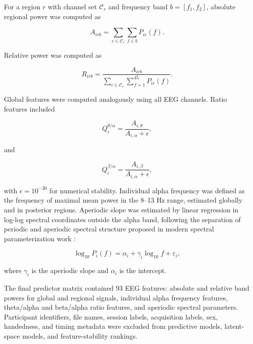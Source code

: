 \documentclass[journal]{IEEEtran}
\begin{document}
For a region $r$ with channel set $\mathcal{C}_r$ and frequency band $b=[f_1,f_2]$, absolute regional power was computed as

\begin{equation}
A_{irb}=\sum_{c\in\mathcal{C}_r}\sum_{f\in b} P_{ic}(f).
\end{equation}

Relative power was computed as

\begin{equation}
R_{irb}=\frac{A_{irb}}{\sum_{c\in\mathcal{C}_r}\sum_{f=1}^{45}P_{ic}(f)}.
\end{equation}

Global features were computed analogously using all EEG channels. Ratio features included

\begin{equation}
Q^{\theta/\alpha}_{i}=\frac{A_{i,\theta}}{A_{i,\alpha}+\epsilon},
\end{equation}

and

\begin{equation}
Q^{\beta/\alpha}_{i}=\frac{A_{i,\beta}}{A_{i,\alpha}+\epsilon},
\end{equation}

with $\epsilon=10^{-30}$ for numerical stability. Individual alpha frequency was defined as the frequency of maximal mean power in the 8--13 Hz range, estimated globally and in posterior regions. Aperiodic slope was estimated by linear regression in log-log spectral coordinates outside the alpha band, following the separation of periodic and aperiodic spectral structure proposed in modern spectral parameterization work \cite{voytek2015age,donoghue2020parameterizing}:

\begin{equation}
\log_{10} P_i(f) = \alpha_i + \gamma_i \log_{10} f + \varepsilon_i,
\end{equation}

where $\gamma_i$ is the aperiodic slope and $\alpha_i$ is the intercept.

The final predictor matrix contained 93 EEG features: absolute and relative band powers for global and regional signals, individual alpha frequency features, theta/alpha and beta/alpha ratio features, and aperiodic spectral parameters. Participant identifiers, file names, session labels, acquisition labels, sex, handedness, and timing metadata were excluded from predictive models, latent-space models, and feature-stability rankings.
\end{document}

